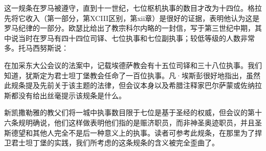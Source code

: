 这一规条在罗马被遵守，直到十一世纪，七位枢机执事的数目才改为十四位。格拉先将它收入（第一部分，第XCIII区别，第xii章）是很好的证据，表明他认为这是罗马纪律的一部分。欧瑟比给出了教宗科尔内略的一封信，写于第三世纪中期，其中说当时在罗马有四十四位司铎、七位执事和七位副执事；较低等级的人数非常多。托马西努斯说：\par

在加采东大公会议的法案中，记载埃德萨教会有十五位司铎和三十八位执事。我们知道，犹斯定为君士坦丁堡教会任命了一百位执事。凡·埃斯彭很好地指出，虽然此规条提及先前关于该主题的法律，但会议本身以及希腊注释家巴尔萨蒙或佐纳拉斯都没有给出丝毫提示该规条是什么。\par

新凯撒勒雅的教父们将一城中执事数目限于七位是基于圣经的权威，但会议的第十六条规明确说，他们这样做表明他们指的是赈济职员，而非神圣奥迹职员，并且圣斯德望和其他人完全不是后一种意义上的执事。读者可参考此规条，在那里为了捍卫君士坦丁堡的实践，我们所考虑的这条规条的含义被完全歪曲了。\par

